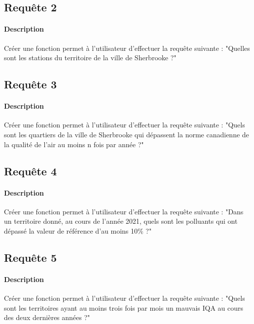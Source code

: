 \documentclass{article}
\begin{document}
\subsection{Requête 2}
\paragraph{Description} Créer une fonction permet à l'utilisateur
d'effectuer la requête suivante : "Quelles sont les stations du territoire
de la ville de Sherbrooke ?"

\subsection{Requête 3}
\paragraph{Description} Créer une fonction permet à l'utilisateur
d'effectuer la requête suivante : "Quels sont les quartiers de la ville
de Sherbrooke qui dépassent la norme canadienne de la qualité de l'air
au moins n fois par année ?"

\subsection{Requête 4}
\paragraph{Description} Créer une fonction permet à l'utilisateur
d'effectuer la requête suivante : "Dans un territoire donné, au cours de
l'année 2021, quels sont les polluants qui ont dépassé la valeur de 
référence d'au moins 10\% ?"

\subsection{Requête 5}
\paragraph{Description} Créer une fonction permet à l'utilisateur
d'effectuer la requête suivante : "Quels sont les territoires ayant au
moins trois fois par mois un mauvais IQA au  cours des deux dernières
années ?"
\end{document}
